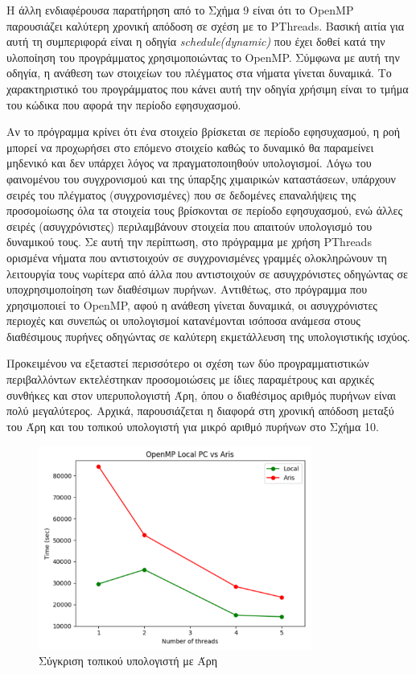 \documentclass[12pt,a4paper]{article}
\begin{document}
Η άλλη ενδιαφέρουσα παρατήρηση από το Σχήμα 9 είναι ότι το OpenMP παρουσιάζει καλύτερη χρονική απόδοση σε σχέση με το PThreads. Βασική αιτία για αυτή τη συμπεριφορά είναι η οδηγία \textit{schedule(dynamic)} που έχει δοθεί κατά την υλοποίηση του προγράμματος χρησιμοποιώντας το OpenMP. Σύμφωνα με αυτή την οδηγία, η ανάθεση των στοιχείων του πλέγματος στα νήματα γίνεται δυναμικά. Το χαρακτηριστικό του προγράμματος που κάνει αυτή την οδηγία χρήσιμη είναι το τμήμα του κώδικα που αφορά την περίοδο εφησυχασμού.

Αν το πρόγραμμα κρίνει ότι ένα στοιχείο βρίσκεται σε περίοδο εφησυχασμού, η ροή μπορεί να προχωρήσει στο επόμενο στοιχείο καθώς το δυναμικό θα παραμείνει μηδενικό και δεν υπάρχει λόγος να πραγματοποιηθούν υπολογισμοί. Λόγω του φαινομένου του συγχρονισμού και της ύπαρξης χιμαιρικών καταστάσεων, υπάρχουν σειρές του πλέγματος (συγχρονισμένες) που σε δεδομένες επαναλήψεις της προσομοίωσης όλα τα στοιχεία τους βρίσκονται σε περίοδο εφησυχασμού, ενώ άλλες σειρές (ασυγχρόνιστες) περιλαμβάνουν στοιχεία που απαιτούν υπολογισμό του δυναμικού τους. Σε αυτή την περίπτωση, στο πρόγραμμα με χρήση PThreads ορισμένα νήματα που αντιστοιχούν σε συγχρονισμένες γραμμές ολοκληρώνουν τη λειτουργία τους νωρίτερα από άλλα που αντιστοιχούν σε ασυγχρόνιστες οδηγώντας σε υποχρησιμοποίηση των διαθέσιμων πυρήνων. Αντιθέτως, στο πρόγραμμα που χρησιμοποιεί το OpenMP, αφού η ανάθεση γίνεται δυναμικά, οι ασυγχρόνιστες περιοχές και συνεπώς οι υπολογισμοί κατανέμονται ισόποσα ανάμεσα στους διαθέσιμους πυρήνες οδηγώντας σε καλύτερη εκμετάλλευση της υπολογιστικής ισχύος.

Προκειμένου να εξεταστεί περισσότερο οι σχέση των δύο προγραμματιστικών περιβαλλόντων εκτελέστηκαν προσομοιώσεις με ίδιες παραμέτρους και αρχικές συνθήκες και στον υπερυπολογιστή Άρη, όπου ο διαθέσιμος αριθμός πυρήνων είναι πολύ μεγαλύτερος. Αρχικά, παρουσιάζεται η διαφορά στη χρονική απόδοση μεταξύ του Άρη και του τοπικού υπολογιστή για μικρό αριθμό πυρήνων στο Σχήμα 10.

\begin{figure}[h!]
\centering
\includegraphics[width=0.8\textwidth]{Figures/localvsaris.png}
\caption{Σύγκριση τοπικού υπολογιστή με Άρη}
\end{figure}
\end{document}
